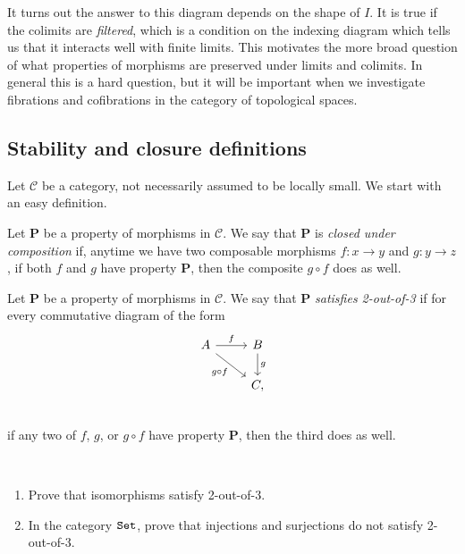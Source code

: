 \documentclass{article}[11pt]
\begin{document}
It turns out the answer to this diagram depends on the shape of $I$. It is true if the colimits are \textit{filtered}, which is a condition on the indexing diagram which tells us that it interacts well with finite limits. This motivates the more broad question of what properties of morphisms are preserved under limits and colimits. In general this is a hard question, but it will be important when we investigate fibrations and cofibrations in the category of topological spaces.


\subsection{Stability and closure definitions}



Let $\mathscr{C}$ be a category, not necessarily assumed to be locally small. We start with an easy definition.

\begin{definition}\label{def:closed-under-pullback} Let \textbf{P} be a property of morphisms in $\mathscr{C}$. We say that \textbf{P} is \textit{closed under composition} if, anytime we have two composable morphisms $f: x \to y$ and $g: y \to z$, if both $f$ and $g$ have property \textbf{P}, then the composite $g\circ f$ does as well.
\end{definition}


\begin{definition}\label{def:2-out-of-3} Let \textbf{P} be a property of morphisms in $\mathscr{C}$. We say that \textbf{P} \textit{satisfies 2-out-of-3} if for every commutative diagram of the form
\[ \begin{tikzcd}
    A\rar["f" above]\ar[dr,"g\circ f" below left] & B\dar["g" right]\\
     & C,\\
\end{tikzcd} \]
if any two of $f$, $g$, or $g\circ f$ have property \textbf{P}, then the third does as well.
\end{definition}

\begin{exercise} $\ $
\begin{enumerate}
    \item Prove that isomorphisms satisfy 2-out-of-3.
    \item In the category $\texttt{Set}$, prove that injections and surjections do not satisfy 2-out-of-3.
\end{enumerate}
\end{exercise}
\end{document}

